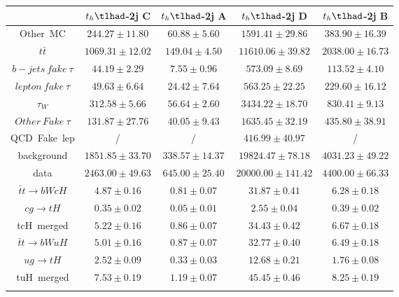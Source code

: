 \begin{tabular}{ccccc} \toprule\toprule
 & $t_{h}\tlhad$-2j C & $t_{h}\tlhad$-2j A & $t_{h}\tlhad$-2j D & $t_{h}\tlhad$-2j B\\\midrule
Other~MC & $244.27\pm11.80$ & $60.88\pm5.60$ & $1591.41\pm29.86$ & $383.90\pm16.39$\\
$t\bar{t}$ & $1069.31\pm12.02$ & $149.04\pm4.50$ & $11610.06\pm39.82$ & $2038.00\pm16.73$\\
$b-jets~fake~\tau$ & $44.19\pm2.29$ & $7.55\pm0.96$ & $573.09\pm8.69$ & $113.52\pm4.10$\\
$lepton~fake~\tau$ & $49.63\pm6.64$ & $24.42\pm7.64$ & $563.25\pm22.25$ & $229.60\pm16.12$\\
$\tau_{W}$ & $312.58\pm5.66$ & $56.64\pm2.60$ & $3434.22\pm18.70$ & $830.41\pm9.13$\\
$Other~Fake~\tau$ & $131.87\pm27.76$ & $40.05\pm9.43$ & $1635.45\pm32.19$ & $435.80\pm38.91$\\
QCD~Fake~lep &  / &  / & $416.99\pm40.97$ &  /\\
background & $1851.85\pm33.70$ & $338.57\pm14.37$ & $19824.47\pm78.18$ & $4031.23\pm49.22$\\
data & $2463.00\pm49.63$ & $645.00\pm25.40$ & $20000.00\pm141.42$ & $4400.00\pm66.33$\\
$\bar{t}t\to bWcH$ & $4.87\pm0.16$ & $0.81\pm0.07$ & $31.87\pm0.41$ & $6.28\pm0.18$\\
$cg\to tH$ & $0.35\pm0.02$ & $0.05\pm0.01$ & $2.55\pm0.04$ & $0.39\pm0.02$\\
tcH~merged & $5.22\pm0.16$ & $0.86\pm0.07$ & $34.43\pm0.42$ & $6.67\pm0.18$\\
$\bar{t}t\to bWuH$ & $5.01\pm0.16$ & $0.87\pm0.07$ & $32.77\pm0.40$ & $6.49\pm0.18$\\
$ug\to tH$ & $2.52\pm0.09$ & $0.33\pm0.03$ & $12.68\pm0.21$ & $1.76\pm0.08$\\
tuH~merged & $7.53\pm0.19$ & $1.19\pm0.07$ & $45.45\pm0.46$ & $8.25\pm0.19$\\
\bottomrule\bottomrule\\
\end{tabular}
